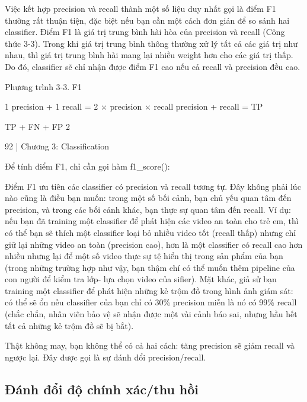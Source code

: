 Việc kết hợp precision và recall thành một số liệu duy nhất gọi là điểm F1 thường rất thuận tiện, đặc biệt nếu bạn cần một cách đơn giản để so sánh hai classifier. Điểm F1 là giá trị trung bình hài hòa của precision và recall (Công thức 3-3). Trong khi giá trị trung bình thông thường xử lý tất cả các giá trị như nhau, thì giá trị trung bình hài mang lại nhiều weight hơn cho các giá trị thấp. Do đó, classifier sẽ chỉ nhận được điểm F1 cao nếu cả recall và precision đều cao.

Phương trình 3-3. F1

1 precision + 1 recall = 2 × precision × recall precision + recall = TP

TP + FN + FP 2

92 | Chương 3: Classification

Để tính điểm F1, chỉ cần gọi hàm f1\_score():

Điểm F1 ưu tiên các classifier có precision và recall tương tự. Đây không phải lúc nào cũng là điều bạn muốn: trong một số bối cảnh, bạn chủ yếu quan tâm đến precision, và trong các bối cảnh khác, bạn thực sự quan tâm đến recall. Ví dụ: nếu bạn đã training một classifier để phát hiện các video an toàn cho trẻ em, thì có thể bạn sẽ thích một classifier loại bỏ nhiều video tốt (recall thấp) nhưng chỉ giữ lại những video an toàn (precision cao), hơn là một classifier có recall cao hơn nhiều nhưng lại để một số video thực sự tệ hiển thị trong sản phẩm của bạn (trong những trường hợp như vậy, bạn thậm chí có thể muốn thêm pipeline của con người để kiểm tra lớp‐ lựa chọn video của sifier). Mặt khác, giả sử bạn training một classifier để phát hiện những kẻ trộm đồ trong hình ảnh giám sát: có thể sẽ ổn nếu classifier của bạn chỉ có 30\% precision miễn là nó có 99\% recall (chắc chắn, nhân viên bảo vệ sẽ nhận được một vài cảnh báo sai, nhưng hầu hết tất cả những kẻ trộm đồ sẽ bị bắt).

Thật không may, bạn không thể có cả hai cách: tăng precision sẽ giảm recall và ngược lại. Đây được gọi là sự đánh đổi precision/recall.

\subsection{Đánh đổi độ chính xác/thu hồi}

